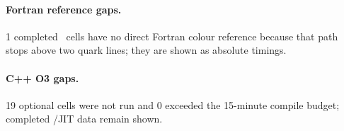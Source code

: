 \begin{landscape}
\paragraph{Fortran reference gaps.}
\noindent\scriptsize 1 completed \PAC\ cells have no direct Fortran colour reference because that path stops above two quark lines; they are shown as absolute timings.
\par\vspace{0.15em}
\paragraph{C++ O3 gaps.}
\noindent\scriptsize 19 optional cells were not run and 0 exceeded the 15-minute compile budget; completed \AC/JIT data remain shown.
\par\vspace{0.15em}
\end{landscape}
